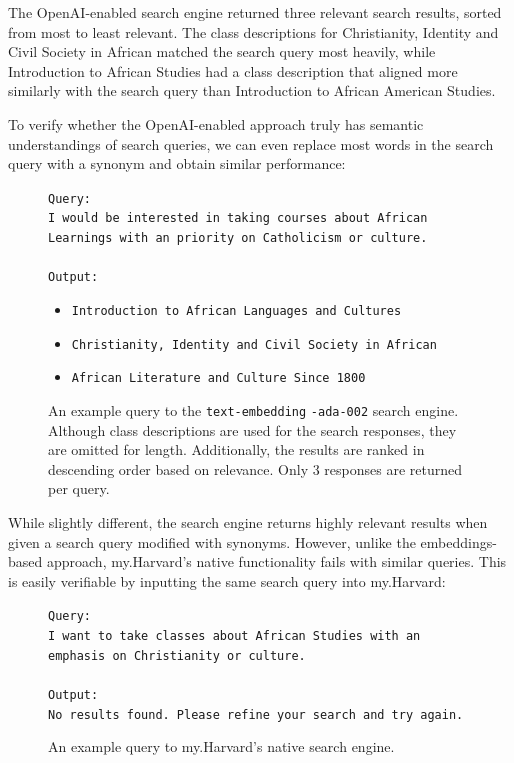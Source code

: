 \documentclass[
	a4paper, %
	10pt, %
	unnumberedsections, %
	twoside, %
]{LTJournalArticle}
\begin{document}
The OpenAI-enabled search engine returned three relevant search results, sorted from most to least relevant. The class descriptions for Christianity, Identity and Civil Society in African matched the search query most heavily, while Introduction to African Studies had a class description that aligned more similarly with the search query than Introduction to African American Studies.  

To verify whether the OpenAI-enabled approach truly has semantic understandings of search queries, we can even replace most words in the search query with a synonym and obtain similar performance: 

\begin{figure}[h]
	\begin{center}
		\texttt{Query:} \\
		\texttt{I would be interested in taking courses about African Learnings with an priority on Catholicism or culture.} \\
		\texttt{}\\
		\texttt{Output:} 
		\begin{itemize}
			\item \texttt{Introduction to African Languages and Cultures}
			\item \texttt{Christianity, Identity and Civil Society in African}
			\item \texttt{African Literature and Culture Since 1800}
		\end{itemize}		
	\end{center}

	\caption{An example query to the \texttt{text-embedding} \texttt{-ada-002} search engine. Although class descriptions are used for the search responses, they are omitted for length. Additionally, the results are ranked in descending order based on relevance. Only 3 responses are returned per query.}
\end{figure}

While slightly different, the search engine returns highly relevant results when given a search query modified with synonyms. However, unlike the embeddings-based approach, my.Harvard's native functionality fails with similar queries. This is easily verifiable by inputting the same search query into my.Harvard: 


\begin{figure}[h]
	\begin{center}
		\texttt{Query:} \\
		\texttt{I want to take classes about African Studies with an emphasis on Christianity or culture.} \\
		\texttt{}\\
		\texttt{Output: }\\
		\texttt{No results found. Please refine your search and try again.}		 
	\end{center}
	\caption{An example query to my.Harvard's native search engine.}
	\label{fig:ex2}
\end{figure}
\end{document}

